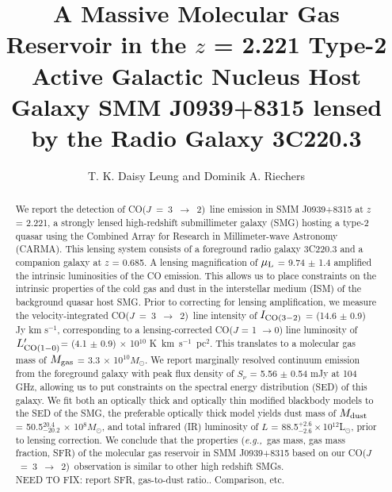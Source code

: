 \documentclass[twocolumn,apj,numberedappendix]{emulateapj}
\newcommand{\Msun}{\mbox{$M_{\odot}$}}
\newcommand{\Lsun}{\mbox{L$_{\odot}$}}
\newcommand{\rarr}{$\rightarrow$}
\newcommand{\CO}{\mbox{CO($J$ = 3 $\rightarrow$ 2) }}
\newcommand{\Lp}{\mbox{$L^{\prime}_{\rm CO(1-0)}$}}
\newcommand{\LpU}{\mbox{K km s$^{-1}$ pc$^2$}}
\newcommand{\eg}{{\sl e.g.,~}}
\newcommand{\pmOne}{$^{-1}$}
\begin{document}
\title{A Massive Molecular Gas Reservoir in the $z$ = 2.221 Type-2 Active Galactic Nucleus Host Galaxy SMM J0939+8315 lensed by the Radio Galaxy 3C220.3}
\author{T. K. Daisy Leung and Dominik A. Riechers}

\begin{abstract}
We report the detection of \CO line emission in SMM J0939+8315 at $z$ = 2.221, a
strongly lensed high-redshift submillimeter galaxy (SMG) hosting a type-2 quasar using
the Combined Array for Research in Millimeter-wave Astronomy (CARMA). This lensing system consists of a
foreground radio galaxy 3C220.3 and a companion galaxy at $z$ = 0.685. A lensing magnification of $\mu_{\rm L}$ = 9.74 $\pm$ 1.4 amplified the intrinsic luminosities of the CO emission. This allows us to place constraints on the intrinsic properties
of the cold gas and dust in the interstellar medium (ISM) of the background quasar host SMG. Prior to correcting for lensing 
amplification, we measure the
velocity-integrated \CO line intensity of $I_{\rm CO(3-2)}$ = (14.6 $\pm$ 0.9) Jy km s\pmOne,
corresponding to a lensing-corrected CO($J$ = 1 \rarr 0) line luminosity of \Lp = (4.1 $\pm$ 
0.9) $\times$ 10$^{10}$ \LpU. This
translates to a molecular gas mass of $M_{\rm gas}$ = 3.3 $\times$ 10$^{10}M_\odot$. We report marginally resolved continuum 
emission from the foreground galaxy with peak flux density of $S_\nu$ = 5.56 $\pm$ 0.54 mJy
 at 104 GHz, allowing us to put constraints on the spectral energy distribution (SED) of this galaxy. We 
fit
 both an optically thick and optically thin modified blackbody models to the SED of the SMG, the preferable optically thick model  yields dust mass of $M_{\rm
dust}$ = 50.5$^{20.4}_{-20.2}$ $\times$ 10$^8$\Msun, and total infrared (IR) luminosity of $L$ = 88.5$^{+2.6}
_{-2.6}\times$10$^{12}$\Lsun, prior to lensing correction. We conclude that the properties (\eg gas mass, gas mass 
fraction, SFR) of the molecular gas reservoir in SMM
J0939+8315 based on our \CO observation is similar to other high redshift
SMGs. \\
NEED TO  FIX: 
report SFR, gas-to-dust ratio.. Comparison, etc. 
\end{abstract}
\end{document}
